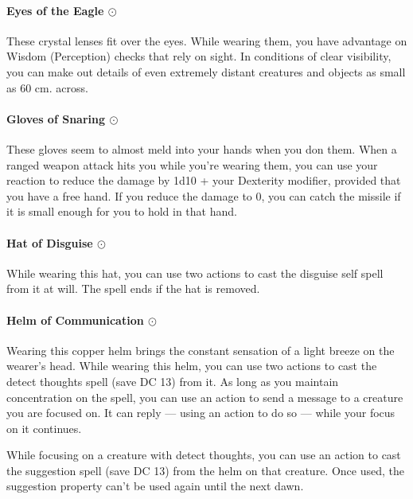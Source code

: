    \paragraph{Eyes of the Eagle $\odot$}
        These crystal lenses fit over the eyes.
        While wearing them, you have advantage on Wisdom (Perception) checks that rely on sight.
        In conditions of clear visibility, you can make out details of even extremely distant creatures and objects as small as 60 cm. across.
    \paragraph{Gloves of Snaring $\odot$}
        These gloves seem to almost meld into your hands when you don them.
        When a ranged weapon attack hits you while you're wearing them, you can use your reaction to reduce the damage by 1d10 + your Dexterity modifier, provided that you have a free hand.
        If you reduce the damage to 0, you can catch the missile if it is small enough for you to hold in that hand.
    \paragraph{Hat of Disguise $\odot$}
        While wearing this hat, you can use two actions to cast the disguise self spell from it at will.
        The spell ends if the hat is removed.
    \paragraph{Helm of Communication $\odot$}
        Wearing this copper helm brings the constant sensation of a light breeze on the wearer's head.
        While wearing this helm, you can use two actions to cast the detect thoughts spell (save DC 13) from it.
        As long as you maintain concentration on the spell, you can use an action to send a message to a creature you are focused on.
        It can reply --- using an action to do so --- while your focus on it continues.

        While focusing on a creature with detect thoughts, you can use an action to cast the suggestion spell (save DC 13) from the helm on that creature.
        Once used, the suggestion property can't be used again until the next dawn.
